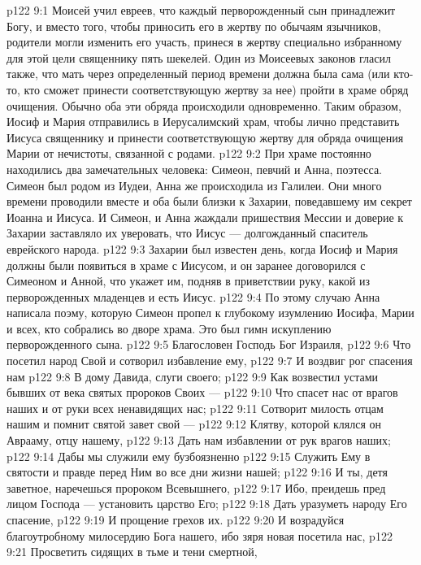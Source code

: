 \vs p122 9:1 Моисей учил евреев, что каждый перворожденный сын принадлежит Богу, и вместо того, чтобы приносить его в жертву по обычаям язычников, родители могли изменить его участь, принеся в жертву специально избранному для этой цели священнику пять шекелей. Один из Моисеевых законов гласил также, что мать через определенный период времени должна была сама (или кто\hyp{}то, кто сможет принести соответствующую жертву за нее) пройти в храме обряд очищения. Обычно оба эти обряда происходили одновременно. Таким образом, Иосиф и Мария отправились в Иерусалимский храм, чтобы лично представить Иисуса священнику и принести соответствующую жертву для обряда очищения Марии от нечистоты, связанной с родами.
\vs p122 9:2 \pc При храме постоянно находились два замечательных человека: Симеон, певчий и Анна, поэтесса. Симеон был родом из Иудеи, Анна же происходила из Галилеи. Они много времени проводили вместе и оба были близки к Захарии, поведавшему им секрет Иоанна и Иисуса. И Симеон, и Анна жаждали пришествия Мессии и доверие к Захарии заставляло их уверовать, что Иисус --- долгожданный спаситель еврейского народа.
\vs p122 9:3 Захарии был известен день, когда Иосиф и Мария должны были появиться в храме с Иисусом, и он заранее договорился с Симеоном и Анной, что укажет им, подняв в приветствии руку, какой из перворожденных младенцев и есть Иисус.
\vs p122 9:4 По этому случаю Анна написала поэму, которую Симеон пропел к глубокому изумлению Иосифа, Марии и всех, кто собрались во дворе храма. Это был гимн искуплению перворожденного сына.
\vs p122 9:5 Благословен Господь Бог Израиля,
\vs p122 9:6 Что посетил народ Свой и сотворил избавление ему,
\vs p122 9:7 И воздвиг рог спасения нам
\vs p122 9:8 В дому Давида, слуги своего;
\vs p122 9:9 Как возвестил устами бывших от века святых пророков Своих ---
\vs p122 9:10 Что спасет нас от врагов наших и от руки всех ненавидящих нас;
\vs p122 9:11 Сотворит милость отцам нашим и помнит святой завет свой ---
\vs p122 9:12 Клятву, которой клялся он Аврааму, отцу нашему,
\vs p122 9:13 Дать нам избавлении от рук врагов наших;
\vs p122 9:14 Дабы мы служили ему бузбоязненно
\vs p122 9:15 Служить Ему в святости и правде перед Ним во все дни жизни нашей;
\vs p122 9:16 И ты, детя заветное, наречешься пророком Всевышнего,
\vs p122 9:17 Ибо, преидешь пред лицом Господа --- установить царство Его;
\vs p122 9:18 Дать уразуметь народу Его спасение,
\vs p122 9:19 И прощение грехов их.
\vs p122 9:20 И возрадуйся благоутробному милосердию Бога нашего, ибо зяря новая посетила нас,
\vs p122 9:21 Просветить сидящих в тьме и тени смертной,
